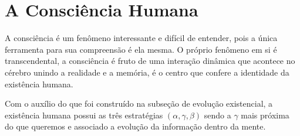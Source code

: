 \documentclass[10pt,a4paper]{report}
\begin{document}


\section{A Consciência Humana}

\hspace{\baselineskip}

A consciência é um fenômeno interessante e difícil de entender, pois a única ferramenta para sua compreensão é ela mesma. O próprio fenômeno em si é transcendental, a consciência é fruto de uma interação dinâmica que acontece no cérebro unindo a realidade e a memória, é o centro que confere a identidade da existência humana.



\hspace{\baselineskip}

Com o auxílio do que foi construído na subseção de evolução existencial, a existência humana possui as três estratégias $(\alpha, \gamma, \beta)$ sendo a $\gamma$ mais próxima do que queremos e associado a evolução da informação dentro da mente.


\end{document}
